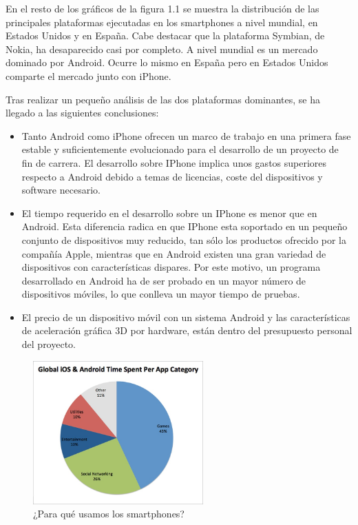En el resto de los gráficos de la figura 1.1 se muestra la distribución de las principales plataformas ejecutadas en los smartphones a nivel mundial, en Estados Unidos y en España. Cabe destacar que la plataforma Symbian, de Nokia, ha desaparecido casi por completo. A nivel mundial es un mercado dominado por Android. Ocurre lo mismo en España pero en Estados Unidos comparte el mercado junto con iPhone.
\newline

Tras realizar un pequeño análisis de las dos plataformas dominantes, se ha llegado a las siguientes conclusiones:
\begin{itemize}
\item Tanto Android como iPhone ofrecen un marco de trabajo en una primera fase estable y suficientemente evolucionado para el desarrollo de un proyecto de fin de carrera.
El desarrollo sobre IPhone implica unos gastos superiores respecto a Android debido a temas de licencias, coste del dispositivos y software necesario.
\item El tiempo requerido en el desarrollo sobre un IPhone es menor que en Android. Esta diferencia radica en que IPhone esta soportado en un pequeño conjunto de dispositivos muy reducido, tan sólo los productos ofrecido por la compañía Apple, mientras que en Android existen una gran variedad de  dispositivos con características dispares.
Por este motivo, un programa desarrollado en Android ha de ser probado en un mayor número de dispositivos móviles, lo que conlleva un mayor tiempo de pruebas.
\item El precio de un dispositivo móvil con un sistema Android y las características de aceleración gráfica 3D por hardware, están dentro del presupuesto personal  del proyecto.
\end{itemize}

\begin{figure}[h]
	\centering
        \includegraphics[height=55mm]{imagenes/capitulo1/img5.jpg}
	\caption{¿Para qué usamos los smartphones?}
\end{figure}

